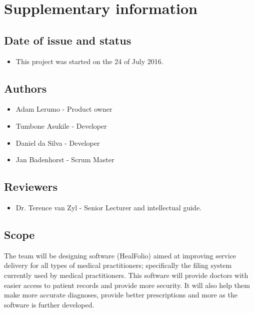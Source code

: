 \documentclass[10pt,oneside]{report}
\begin{document}
\section{Supplementary information}\label{ad:supinfo}

\subsection{Date of issue and status}

\begin{itemize}
\item This project was started on the 24 of July 2016.
\end{itemize}

\subsection{Authors}

\begin{itemize}
\item Adam Lerumo - Product owner
\item Tumbone Asukile - Developer
\item Daniel da Silva - Developer
\item Jan Badenhorst - Scrum Master
\end{itemize}

\subsection{Reviewers}

\begin{itemize}
\item Dr. Terence van Zyl - Senior Lecturer and intellectual guide.
\end{itemize}

\subsection{Scope}

The team will be designing software (HealFolio) aimed at improving service delivery for all types of medical practitioners; specifically the filing system currently used by medical practitioners. This software will provide doctors with easier access to patient records and provide more security. It will also help them make more accurate diagnoses, provide better prescriptions and more as the software is further developed.
\end{document}
